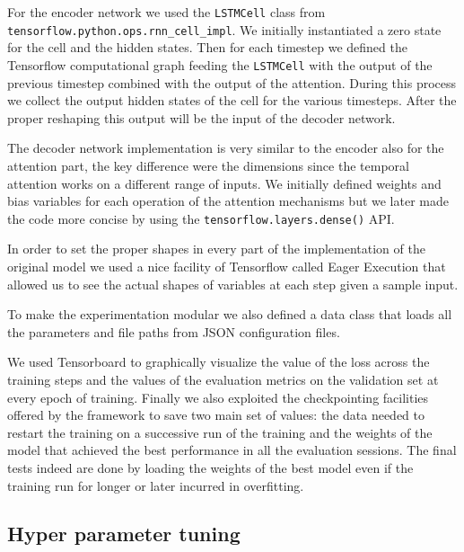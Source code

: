 \documentclass{article}
\begin{document}
For the encoder network we used the \texttt{LSTMCell} class from
\texttt{tensorflow.python.ops.rnn\_cell\_impl}.
We initially instantiated a zero state for the cell and the hidden states. Then
for each timestep we defined the
Tensorflow computational graph feeding the \texttt{LSTMCell} with the output of
the previous timestep combined with the
output of the attention. During this process we collect the output hidden
states of the cell for the various timesteps.
After the proper reshaping this output will be the input of the decoder network.

The decoder network implementation is very similar to the encoder also for the
attention part, the key difference were
the dimensions since the temporal attention works on a different range of
inputs. We initially defined weights and bias
variables for each operation of the attention mechanisms but we later made the
code more concise by using the
\texttt{tensorflow.layers.dense()} API.

In order to set the proper shapes in every part of the implementation of the
original model we used a nice facility of
Tensorflow called Eager Execution that allowed us to see the actual shapes of
variables at each step given a sample
input.

To make the experimentation modular we also defined a data class that loads all
the parameters and file paths from
JSON configuration files.

We used Tensorboard to graphically visualize the value of the loss across 
the training steps and the values of the evaluation metrics on the validation set 
at every epoch of training. Finally we also exploited the checkpointing facilities
offered by the framework to save two main set of values: the data needed to 
restart the training on a successive run of the training and the weights of the 
model that achieved the best performance in all the evaluation sessions. The final
tests indeed are done by loading the weights of the best model even if the 
training run for longer or later incurred in overfitting.


\subsection{Hyper parameter tuning}
\end{document}
